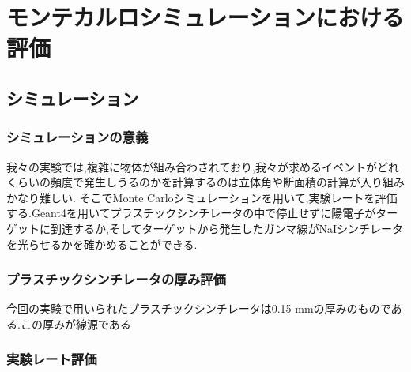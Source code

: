 \chapter{モンテカルロシミュレーションにおける評価}\label{simulation}

\section{シミュレーション}

\subsection{シミュレーションの意義}

我々の実験では,複雑に物体が組み合わされており,我々が求めるイベントがどれくらいの頻度で発生しうるのかを計算するのは立体角や断面積の計算が入り組みかなり難しい.
そこでMonte Carloシミュレーションを用いて,実験レートを評価する.Geant4を用いてプラスチックシンチレータの中で停止せずに陽電子がターゲットに到達するか,そしてターゲットから発生したガンマ線がNaIシンチレータを光らせるかを確かめることができる.

\subsection{プラスチックシンチレータの厚み評価}
今回の実験で用いられたプラスチックシンチレータは0.15 mmの厚みのものである.この厚みが線源である

\subsection{実験レート評価}
